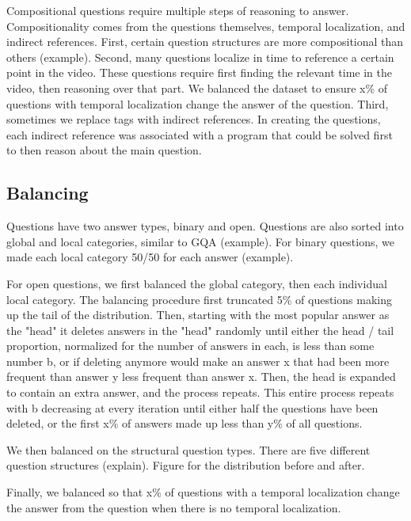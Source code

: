 \documentclass[10pt,twocolumn,letterpaper]{article}
\newcommand{\mgm}[1]{{\color{cyan}{mgm: #1}}}
\begin{document}
Compositional questions require multiple steps of reasoning to answer. Compositionality comes from the questions themselves, temporal localization, and indirect references. First, certain question structures are more compositional than others (example). Second, many questions localize in time to reference a certain point in the video. These questions require first finding the relevant time in the video, then reasoning over that part. We balanced the dataset to ensure x\% of questions with temporal localization change the answer of the question. Third, sometimes we replace tags with indirect references. In creating the questions, each indirect reference was associated with a program that could be solved first to then reason about the main question.

\subsection{Balancing}

Questions have two answer types, binary and open. Questions are also sorted into global and local categories, similar to GQA (example). For binary questions, we made each local category 50/50 for each answer (example). 

For open questions, we first balanced the global category, then each individual local category. The balancing procedure first truncated 5\% of questions making up the tail of the distribution. \mgm{may want to have a separate algorithm aside to describe this idk. It's a bit of a mouthful} Then, starting with the most popular answer as the "head" it deletes answers in the "head" randomly until either the head / tail proportion, normalized for the number of answers in each, is less than some number b, or if deleting anymore would make an answer x that had been more frequent than answer y less frequent than answer x. Then, the head is expanded to contain an extra answer, and the process repeats. This entire process repeats with b decreasing at every iteration until either half the questions have been deleted, or the first x\% of answers made up less than y\% of all questions. \mgm{Do we need to explain where got the numbers from? It was mostly just experimenting}

    We then balanced on the structural question types. There are five different question structures (explain). Figure for the distribution before and after.

Finally, we balanced so that x\% of questions with a temporal localization change the answer from the question when there is no temporal localization.
\end{document}
